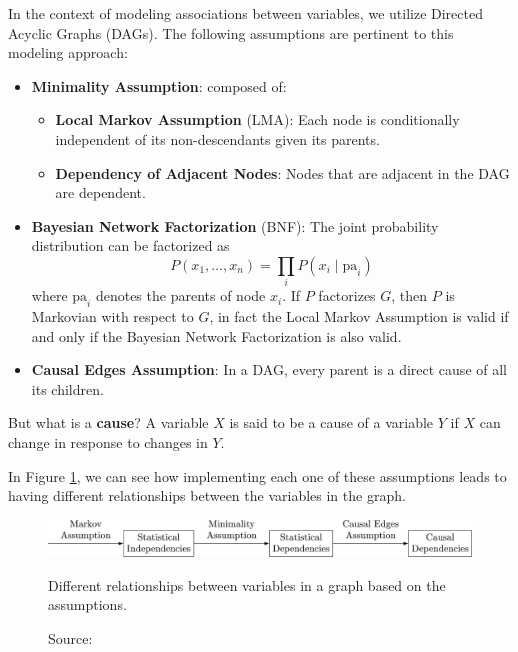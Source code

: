 In the context of modeling associations between variables,
we utilize Directed Acyclic Graphs (DAGs).
The following assumptions are pertinent to this modeling approach:

\begin{itemize}
    \item \textbf{Minimality Assumption}: composed of:
    \begin{itemize}
        \item \textbf{Local Markov Assumption} (LMA):
        Each node is conditionally independent of its
        non-descendants given its parents.
        \item \textbf{Dependency of Adjacent Nodes}: Nodes that
        are adjacent in the DAG are dependent.
    \end{itemize}
    \item \textbf{Bayesian Network Factorization} (BNF): The joint probability
    distribution can be factorized as
    \begin{equation}
        P(x_1, \ldots, x_n) = \prod_i P(x_i \mid \text{pa}_i)
    \end{equation}
    where \( \text{pa}_i \) denotes the parents of node \( x_i \).
    If \( P \) factorizes \( G \), then \( P \) is Markovian with
    respect to \( G \), in fact the Local Markov Assumption is valid
    if and only if the Bayesian Network Factorization is also valid.
    \item \textbf{Causal Edges Assumption}: In a DAG, every parent is
    a direct cause of all its children.
\end{itemize}

But what is a \textbf{cause}? A variable \( X \) is said to be a cause
of a variable \( Y \) if \( X \) can change in response to changes in \( Y \).

In Figure \ref{fig:assumptions}, we can see how implementing each one
of these assumptions leads to having different relationships
between the variables in the graph.

\begin{figure}[h]
    \centering
    \includegraphics[width=\textwidth]{figures/ch3/15.assumptions.png}
    \caption{Different relationships between variables in a graph based on the assumptions.}
    \vspace{-10px}
    \caption*{\scriptsize{Source: \cite{Neal_2020a}}}
    \label{fig:assumptions}
\end{figure}

